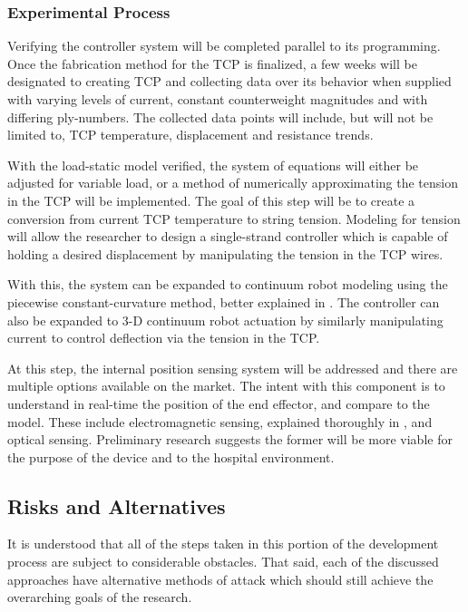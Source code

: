 	\subsubsection{Experimental Process}
	\label{sect:aim1_experimental_process}
	
		Verifying the controller system will be completed parallel to its programming. Once the fabrication method for the TCP is finalized, a few weeks will be designated to creating TCP and collecting data over its behavior when supplied with varying levels of current, constant counterweight magnitudes and with differing ply-numbers. The collected data points will include, but will not be limited to, TCP temperature, displacement and resistance trends.
		
		With the load-static model verified, the system of equations will either be adjusted for variable load, or a method of numerically approximating the tension in the TCP will be implemented. The goal of this step will be to create a conversion from current TCP temperature to string tension. Modeling for tension will allow the researcher to design a single-strand controller which is capable of holding a desired displacement by manipulating the tension in the TCP wires.
		
		With this, the system can be expanded to continuum robot modeling using the piecewise constant-curvature method, better explained in \cite{rao_how_2021}. The controller can also be expanded to 3-D continuum robot actuation by similarly manipulating current to control deflection via the tension in the TCP.
		
		At this step, the internal position sensing system will be addressed and there are multiple options available on the market. The intent with this component is to understand in real-time the position of the end effector, and compare to the model. These include electromagnetic sensing, explained thoroughly in \cite{guo_continuum_2019}, and optical sensing. Preliminary research suggests the former will be more viable for the purpose of the device and to the hospital environment.

\subsection{Risks and Alternatives}

	It is understood that all of the steps taken in this portion of the development process are subject to considerable obstacles. That said, each of the discussed approaches have alternative methods of attack which should still achieve the overarching goals of the research.

